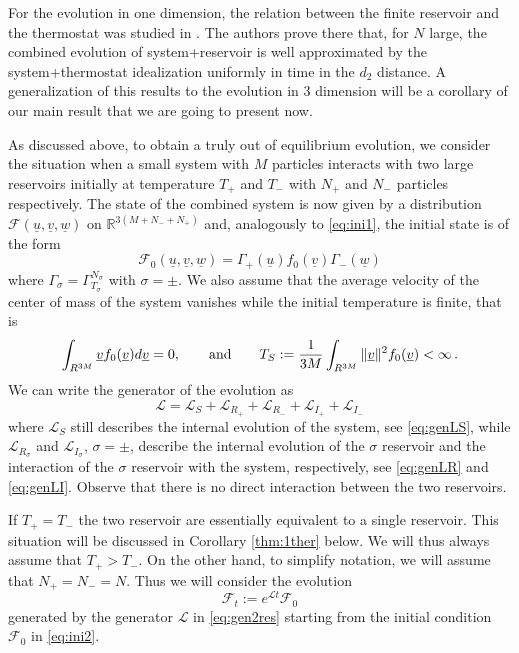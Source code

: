 \documentclass{article}
\def\red{}
\newcommand{\scrF}{{\mathscr F}}
\newcommand \ul[1]{\underline{#1}}
\newcommand*\R{ \mathds{R} }
\newcommand\uv{{\underline v}}
\newcommand\uu{{\underline u}}
\newcommand\uw{{\underline w}}
\begin{document}
For the evolution in one dimension, the relation between the finite reservoir and the thermostat was studied in
\cite{BLTV}. The authors prove there that, for $N$ large, the combined evolution of system+reservoir is well approximated
by the system+thermostat idealization uniformly in time in the $d_2$ distance. A generalization of this results to 
the 
evolution in 3 dimension will be a corollary of our main result that we are going to present now.

As discussed above, to obtain a truly out of equilibrium evolution, we consider the situation when a small system 
with $M$
particles interacts with two large reservoirs initially at temperature $T_+$ and $T_-$ with $N_+$ and $N_-$ 
particles
respectively. The state of the combined system is now given by a distribution $\scrF(\uu,\uv,\uw)$ on
$\R^{3(M+N_-+N_+)}$ and, analogously to \eqref{eq:ini1}, the initial state is of the form
\begin{equation}\label{eq:ini2}
 \scrF_0(\uu,\uv,\uw)=\Gamma_+(\uu)f_0(\uv)\Gamma_-(\uw)
\end{equation}
where $\Gamma_\sigma=\Gamma_{T_\sigma}^{N_\sigma}$ with $\sigma=\pm$. \red{We also assume that the average velocity of the center of mass of the system vanishes while the initial temperature is finite, that is 
\[
\int_{R^{3M}} \ul v f_0(\ul v)d\ul v=0, \qquad\hbox{and}\qquad T_S:=\frac1{3M}\int_{R^{3M}}\|\ul v\|^2 f_0(\ul v)< \infty\, .
\]}
We can write the generator of the evolution as
\begin{equation}\label{eq:gen2res}
 \mathcal L=\mathcal L_S+\mathcal L_{R_+}+\mathcal L_{R_-}+\mathcal L_{I_+}+\mathcal L_{I_-}
\end{equation}
where $\mathcal L_S$ still describes the internal evolution of the system, see \eqref{eq:genLS}, while $\mathcal
L_{R_\sigma}$ and $\mathcal L_{I_\sigma}$, $\sigma=\pm$, describe the internal evolution of the $\sigma$ reservoir
and the interaction of the $\sigma$ reservoir with the system, respectively, see \eqref{eq:genLR} and \eqref{eq:genLI}.
Observe that there is no direct interaction between the two reservoirs.

If $T_+=T_-$ the two reservoir are essentially equivalent to a single reservoir. This situation will be discussed in
Corollary \ref{thm:1ther} below. We will thus always assume that $T_+>T_-$. On the other hand, to simplify 
notation, we
will assume that $N_+=N_-=N$. Thus we will consider the evolution
\begin{equation}\label{eq:evoR}
\scrF_t:=e^{\mathcal L t}\scrF_0
\end{equation}
generated by the generator $\mathcal L$ in \eqref{eq:gen2res} starting from the initial condition $\scrF_0$ in 
\eqref{eq:ini2}.
\end{document}
